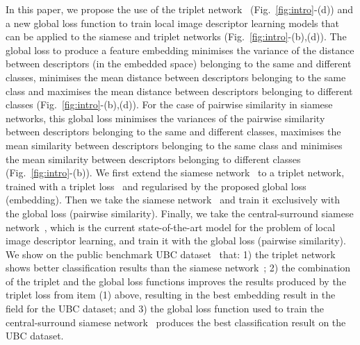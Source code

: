 \documentclass[10pt,twocolumn,letterpaper]{article}
\begin{document}
In this paper, we propose the use of the triplet network~\cite{Wangcvpr14,hoffer2014deep,SchroffKPcvpr15,wohlhartcvpr15} (Fig.~\ref{fig:intro}-(d)) and a new global loss function to train local image descriptor learning models that can be applied to the siamese and triplet networks (Fig.~\ref{fig:intro}-(b),(d)).  
The global loss to produce a feature embedding minimises the variance of the distance between descriptors (in the embedded space) belonging to the same and different classes, minimises the mean distance between descriptors belonging to the same class and maximises the mean distance between descriptors belonging to different classes (Fig.~\ref{fig:intro}-(b),(d)).  
For the case of pairwise similarity in siamese networks, this global loss minimises the variances of the pairwise similarity between descriptors belonging to the same and different classes, maximises the mean similarity between descriptors belonging to the same class and minimises the mean similarity between descriptors belonging to different classes (Fig.~\ref{fig:intro}-(b)).  
We first extend the siamese network~\cite{Han_cvpr15,masci2014descriptor,ZagoruykoCVPR15} to a triplet network, trained with a triplet loss~\cite{Wangcvpr14,hoffer2014deep,SchroffKPcvpr15,wohlhartcvpr15} and regularised by the proposed global loss (embedding).  Then we take the siamese network~\cite{Han_cvpr15,masci2014descriptor,ZagoruykoCVPR15} and train it exclusively with the global loss (pairwise similarity).  Finally, we take the central-surround siamese network~\cite{ZagoruykoCVPR15}, which is the current state-of-the-art model for the problem of local image descriptor learning, and train it with the global loss (pairwise similarity).
We show on the public benchmark UBC dataset~\cite{UBC_dataset,brownpami10,snavely2008modeling} that: 1) the triplet network shows better classification results than the siamese network~\cite{bromley1993signature,masci2014descriptor,ZagoruykoCVPR15}; 2) the combination of the triplet and the global loss functions improves the results produced by the triplet loss from item (1) above, resulting in the best embedding result in the field for the UBC dataset; and 3) the global loss function used to train the central-surround siamese network~\cite{ZagoruykoCVPR15} produces the best classification result on the UBC dataset.  


\end{document}
